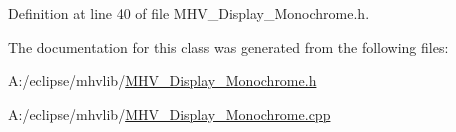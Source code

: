 \-Definition at line 40 of file \-M\-H\-V\-\_\-\-Display\-\_\-\-Monochrome.\-h.



\-The documentation for this class was generated from the following files\-:\begin{DoxyCompactItemize}
\item 
\-A\-:/eclipse/mhvlib/\hyperlink{_m_h_v___display___monochrome_8h}{\-M\-H\-V\-\_\-\-Display\-\_\-\-Monochrome.\-h}\item 
\-A\-:/eclipse/mhvlib/\hyperlink{_m_h_v___display___monochrome_8cpp}{\-M\-H\-V\-\_\-\-Display\-\_\-\-Monochrome.\-cpp}\end{DoxyCompactItemize}
